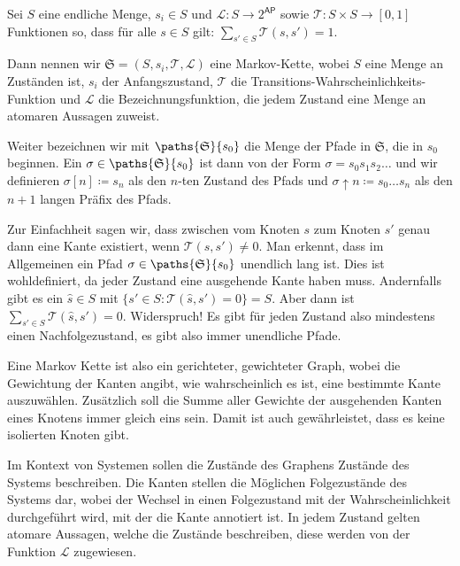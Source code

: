\begin{definition}
	Sei $S$ eine endliche Menge, $s_i\in S$ und $\mathcal{L}:S\to 2^\mathsf{AP}$ sowie $\mathcal{T}:S\times S \to [0,1]$ Funktionen so, dass für alle $s\in S$ gilt: $\sum_{s'\in S}\mathcal{T}(s,s')=1$.
	
	Dann nennen wir $\mathfrak{S}=(S, s_i, \mathcal{T}, \mathcal{L})$ eine Markov-Kette, wobei $S$ eine Menge an Zuständen ist, $s_i$ der Anfangszustand, $\mathcal{T}$ die Transitions-Wahrscheinlichkeits-Funktion und $\mathcal{L}$ die Bezeichnungsfunktion, die jedem Zustand eine Menge an atomaren Aussagen zuweist.
	
	Weiter bezeichnen wir mit $\paths{\mathfrak{S}}{s_0}$ die Menge der Pfade in $\mathfrak{S}$, die in $s_0$ beginnen. 
	Ein $\sigma\in \paths{\mathfrak{S}}{s_0}$ ist dann von der Form $\sigma=s_0s_1s_2\dots$ und wir definieren $\sigma[n]\coloneqq s_n$ als den $n$-ten Zustand des Pfads und $\sigma\uparrow n\coloneqq s_0\dots s_n$ als den $n+1$ langen Präfix des Pfads.
	\cite{hansson1994logic}
\end{definition}

Zur Einfachheit sagen wir, dass zwischen vom Knoten $s$ zum Knoten $s'$ genau dann eine Kante existiert, wenn $\mathcal{T}(s, s') \neq 0$.
Man erkennt, dass im Allgemeinen ein Pfad $\sigma\in \paths{\mathfrak{S}}{s_0}$ unendlich lang ist. 
Dies ist wohldefiniert, da jeder Zustand eine ausgehende Kante haben muss. Andernfalls gibt es ein $\hat s\in S$ mit $\{s'\in S :\mathcal{T}(\hat s, s')= 0 \} = S$. Aber dann ist $\sum_{s'\in S}\mathcal{T}(\hat s, s')=0$. Widerspruch! Es gibt für jeden Zustand also mindestens einen Nachfolgezustand, es gibt also immer unendliche Pfade.

Eine Markov Kette ist also ein gerichteter, gewichteter Graph, wobei die Gewichtung der Kanten angibt, wie wahrscheinlich es ist, eine bestimmte Kante auszuwählen. Zusätzlich soll die Summe aller Gewichte der ausgehenden Kanten eines Knotens immer gleich eins sein. Damit ist auch gewährleistet, dass es keine isolierten Knoten gibt.

Im Kontext von Systemen sollen die Zustände des Graphens Zustände des Systems beschreiben. Die Kanten stellen die Möglichen Folgezustände des Systems dar, wobei der Wechsel in einen Folgezustand mit der Wahrscheinlichkeit durchgeführt wird, mit der die Kante annotiert ist. In jedem Zustand gelten atomare Aussagen, welche die Zustände beschreiben, diese werden von der Funktion $\mathcal{L}$ zugewiesen.

